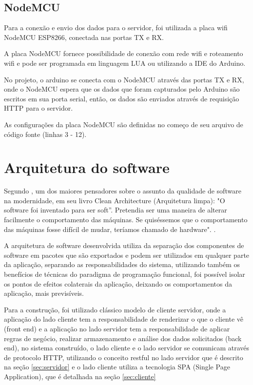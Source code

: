 \subsection{NodeMCU}
\label{sec:nodemcu}

Para a conexão e envio dos dados para o servidor, foi utilizada a placa wifi NodeMCU ESP8266, conectada nas portas TX e RX.

A placa NodeMCU fornece possibilidade de conexão com rede wifi e roteamento wifi e pode ser programada em linguagem LUA ou utilizando a IDE do Arduino.

No projeto, o arduino se conecta com o NodeMCU através das portas TX e RX, onde o NodeMCU espera que os dados que foram capturados pelo Arduino são escritos em sua porta serial, então, os dados são enviados através de requisição HTTP para o servidor.

As configurações da placa NodeMCU são definidas no começo de seu arquivo de código fonte (linhas 3 - 12).

\section{Arquitetura do software}
\label{sec:arquitetura_software}

Segundo , um dos maiores pensadores sobre o assunto da qualidade de software na modernidade, em seu livro Clean Architecture (Arquitetura limpa): "O software foi inventado para ser soft”. Pretendia ser uma maneira de alterar facilmente o comportamento das máquinas. Se quiséssemos que o comportamento das máquinas fosse difícil de mudar, teríamos chamado de hardware". \cite{clean_architecture}.

A arquitetura de software desenvolvida utiliza da separação dos componentes de software em pacotes que são exportados e podem ser utilizados em qualquer parte da aplicação, separando as responsabilidades do sistema, utilizando também os benefícios de técnicas do paradigma de programação funcional, foi possível isolar os pontos de efeitos colaterais da aplicação, deixando os comportamentos da aplicação, mais previsíveis.

Para a construção, foi utilizado clássico modelo de cliente servidor, onde a aplicação do lado cliente tem a responsabilidade de renderizar o que o cliente vê (front end) e a aplicação no lado servidor tem a responsabilidade de aplicar regras de negócio, realizar armazenamento e análise dos dados solicitados (back end), no sistema construído, o lado cliente e o lado servidor se comunicam através de protocolo HTTP, utilizando o conceito restful no lado servidor que é descrito na seção \ref{sec:servidor} e o lado cliente utiliza a tecnologia SPA (Single Page Application), que é detalhada na seção \ref{sec:cliente}

